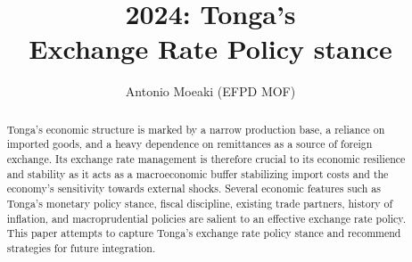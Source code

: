 \documentclass[12pt]{article}
\title{2024: Tonga's\\ Exchange Rate Policy stance }
\author{Antonio Moeaki (EFPD MOF) }
\begin{document}
 

\maketitle

\begin{abstract}
Tonga’s economic structure is marked by a narrow production base, a reliance on imported goods, and a heavy dependence on remittances as a source of foreign exchange. Its exchange rate management is therefore crucial to its economic resilience and stability as it acts as a macroeconomic buffer stabilizing import costs and the economy's sensitivity towards external shocks. Several economic features such as Tonga's monetary policy stance, fiscal discipline, existing trade partners, history of inflation, and macroprudential policies are salient to an effective exchange rate policy. This paper attempts to capture Tonga's exchange rate policy stance and recommend strategies for future integration.



\end{abstract}




     \tableofcontents
\end{document}
